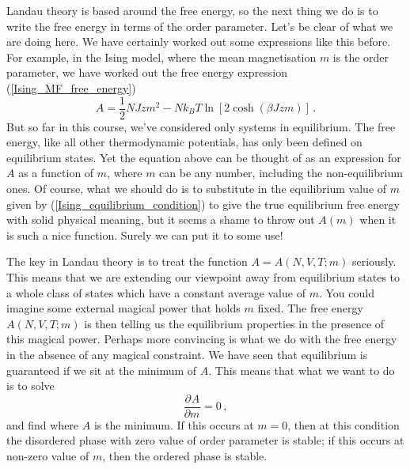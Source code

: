 \documentclass{article}
\theoremstyle{plain}\theoremheaderfont{\normalfont\bfseries}\theorembodyfont{\rmfamily}\theoremseparator{.}\newtheorem*{thm}{Theorem}\newtheorem*{law}{Law}\newtheorem*{pos}{Postulate}
\numberwithin{equation}{section}
\newcommand{\pdv}[3][]{\frac{\partial^{#1} #2}{{\partial #3}^{#1}}}
\begin{document}
    Landau theory is based around the free energy, so the next thing we do is to write the free energy in terms of the order parameter. Let's be clear of what we are doing here. We have certainly worked out some expressions like this before. For example, in the Ising model, where the mean magnetisation \(m\) is the order parameter, we have worked out the free energy expression (\ref{Ising_MF_free_energy})
    \begin{equation}
        A=\frac{1}{2}NJzm^2-Nk_B T\ln[2\cosh(\beta Jzm)]\,.       
    \end{equation}
    But so far in this course, we've considered only systems in equilibrium. The free energy, like all other thermodynamic potentials, has only been defined on equilibrium states. Yet the equation above can be thought of as an expression for \(A\) as a function of \(m\), where \(m\) can be any number, including the non-equilibrium ones. Of course, what we should do is to substitute in the equilibrium value of \(m\) given by (\ref{Ising_equilibrium_condition}) to give the true equilibrium free energy with solid physical meaning, but it seems a shame to throw out \(A(m)\) when it is such a nice function. Surely we can put it to some use!
    
    The key in Landau theory is to treat the function \(A=A(N,V,T;m)\) seriously. This means that we are extending our viewpoint away from equilibrium states to a whole class of states which have a constant average value of \(m\). You could imagine some external magical power that holds \(m\) fixed. The free energy \(A(N,V,T;m)\) is then telling us the equilibrium properties in the presence of this magical power. Perhaps more convincing is what we do with the free energy in the absence of any magical constraint. We have seen that equilibrium is guaranteed if we sit at the minimum of \(A\). This means that what we want to do is to solve
    \begin{equation}
        \pdv{A}{m}=0\,,
    \end{equation}
    and find where \(A\) is the minimum. If this occurs at \(m=0\), then at this condition the disordered phase with zero value of order parameter is stable; if this occurs at non-zero value of \(m\), then the ordered phase is stable.
\end{document}
